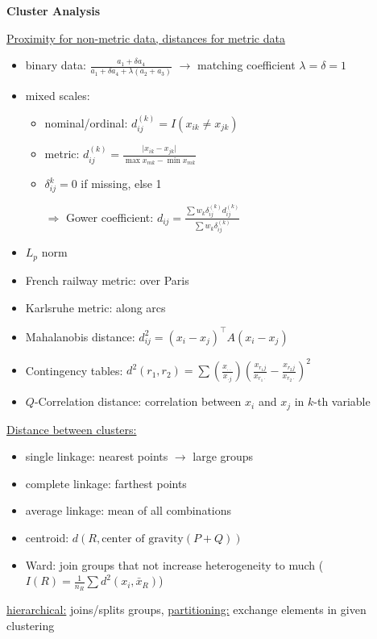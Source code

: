 \documentclass[10pt,landscape,a4paper]{article}
\begin{document}
\begin{multicols*}{4}
\begin{center}
	\normalsize{\textbf{Cluster Analysis}} \\
\end{center}
\underline{Proximity for non-metric data, distances for metric data}
\begin{itemize}
	\item binary data: $\frac{a_1+\delta a_4}{a_1 + \delta a_4 + \lambda(a_2+a_3)}$ $\to$ matching coefficient $\lambda = \delta = 1$
	\item mixed scales:
	\begin{itemize}
		\item nominal/ordinal: $d_{ij}^{(k)} = I(x_{ik} \neq x_{jk})$
		\item metric: $d_{ij}^{(k)} = \frac{\vert x_{ik} - x_{jk}\vert}{\max x_{mk} - \min x_{mk}}$
		\item $\delta_{ij}^{k} = 0$ if missing, else 1
		\item[$\Rightarrow$] Gower coefficient: $d_{ij} = \frac{\sum w_k\delta_{ij}^{(k)}d_{ij}^{(k)}}{\sum w_k\delta_{ij}^{(k)}}$
	\end{itemize}
	\item $L_p$ norm
	\item French railway metric: over Paris
	\item Karlsruhe metric: along arcs
	\item Mahalanobis distance: $d_{ij}^2 = (x_i-x_j)^\top A (x_i-x_j)$
	\item Contingency tables: $d^2(r_1,r_2) = \sum\left(\frac{x_{\cdot\cdot}}{x_{\cdot j}}\right)\left(\frac{x_{r_1j}}{x_{r_1\cdot}} - \frac{x_{r_2j}}{x_{r_2\cdot}}\right)^2$
	\item $Q$-Correlation distance: correlation between $x_i$ and $x_j$ in $k$-th variable
\end{itemize}
\underline{Distance between clusters:}
\begin{itemize}
	\item single linkage: nearest points $\to$ large groups
	\item complete linkage: farthest points
	\item average linkage: mean of all combinations
	\item centroid: $d(R, \text{center of gravity}(P+Q))$
	\item Ward: join groups that not increase heterogeneity to much ($I(R) = \frac{1}{n_R}\sum d^2(x_i,\bar{x}_R)$)
\end{itemize}
\underline{hierarchical:} joins/splits groups, \underline{partitioning:} exchange elements in given clustering


\end{multicols*}
\end{document}
